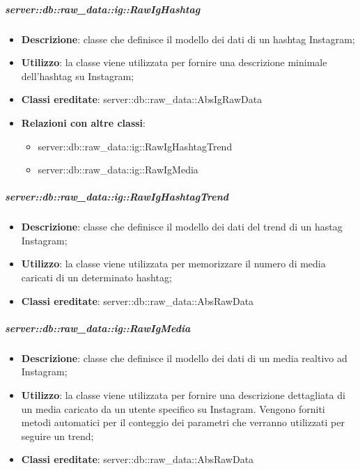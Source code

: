 		\subparagraph{server::db::raw\_data::ig::RawIgHashtag} %
		\label{subp:server_db_raw_data_ig_rawighashtag}
			\begin{itemize}
				\item \textbf{Descrizione}: classe che definisce il modello dei dati di un hashtag Instagram;
				\item \textbf{Utilizzo}: la classe viene utilizzata per fornire una descrizione minimale dell'hashtag su Instagram;
				\item \textbf{Classi ereditate}: server::db::raw\_data::AbsIgRawData
				\item \textbf{Relazioni con altre classi}:
					\begin{itemize}
						\item server::db::raw\_data::ig::RawIgHashtagTrend
						\item server::db::raw\_data::ig::RawIgMedia
					\end{itemize}
			\end{itemize}


		\subparagraph{server::db::raw\_data::ig::RawIgHashtagTrend} %
		\label{subp:server_db_raw_data_ig_rawighashtagtrend}
			\begin{itemize}
				\item \textbf{Descrizione}: classe che definisce il modello dei dati del trend di un hastag Instagram;
				\item \textbf{Utilizzo}: la classe viene utilizzata per memorizzare il numero di media caricati di un determinato hashtag;
				\item \textbf{Classi ereditate}: server::db::raw\_data::AbsRawData
			\end{itemize}


		\subparagraph{server::db::raw\_data::ig::RawIgMedia} %
		\label{subp:server_db_raw_data_ig_rawigmedia}
			\begin{itemize}
				\item \textbf{Descrizione}: classe che definisce il modello dei dati di un media realtivo ad Instagram;
				\item \textbf{Utilizzo}: la classe viene utilizzata per fornire una descrizione dettagliata di un media caricato da un utente specifico su Instagram. Vengono forniti metodi automatici per il conteggio dei parametri che verranno utilizzati per seguire un trend;
				\item \textbf{Classi ereditate}: server::db::raw\_data::AbsRawData
			\end{itemize}

